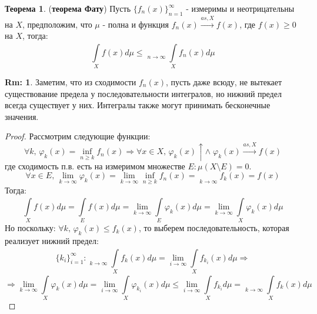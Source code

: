 \documentclass[12pt]{article}
\theoremstyle{definition}
\newtheorem{rem}{Rm:}
\newtheorem{theorem}{Теорема}
\newcommand{\ddint}[2]{\displaystyle\int\limits_{#1}^{#2}}
\DeclareMathOperator*\lowlim{\underline{lim}}
\begin{document}
\begin{theorem}(\textbf{теорема Фату})
	Пусть $\{f_n(x)\}_{n = 1}^{\infty}$ - измеримы и неотрицательны на $X$, предположим, что $\mu$ - полна и функция $f_n(x) \xrightarrow{as, X} f(x)$, где $f(x) \geq 0$ на $X$, тогда:
	$$
		\ddint{X}{}f(x)d\mu \leq \lowlim\limits_{n \to \infty}\ddint{X}{}f_n(x)d\mu
	$$
\end{theorem}
\begin{rem}
	Заметим, что из сходимости $f_n(x)$, пусть даже всюду, не вытекает существование предела у последовательности интегралов, но нижний предел всегда существует у них. Интегралы также могут принимать бесконечные значения.
\end{rem}

\begin{proof}
	Рассмотрим следующие функции: 
	$$
		\forall k, \, \varphi_k(x) = \inf\limits_{n \geq k}f_n(x) \Rightarrow \forall x \in X, \, \varphi_k(x) \uparrow \wedge \; \varphi_k(x) \xrightarrow{as, X} f(x)
	$$
	где сходимость п.в. есть на измеримом множестве $E \colon \mu(X \setminus E) = 0$. 
	$$
		\forall x \in E, \, \lim\limits_{k \to \infty}\varphi_k(x) = \lim\limits_{k \to \infty} \inf\limits_{n \geq k}f_n(x) = \lowlim\limits_{k \to \infty}f_k(x)  = f(x)
	$$
	Тогда:
	$$
		\ddint{X}{}f(x)d\mu = \ddint{E}{}f(x)d\mu = \lim\limits_{k \to \infty}\ddint{E}{}\varphi_k(x)d\mu = \lim\limits_{k \to \infty}\ddint{X}{}\varphi_k(x)d\mu
	$$
	Но поскольку: $\forall k, \, \varphi_k(x) \leq f_k(x)$, то выберем последовательность, которая реализует нижний предел: 
	$$
		\{k_i\}_{i = 1}^{\infty} \colon \lowlim\limits_{k \to \infty}\ddint{X}{}f_k(x)d\mu = \lim\limits_{i \to \infty}\ddint{X}{}f_{k_i}(x)d\mu \Rightarrow
	$$
	$$
		\Rightarrow \lim\limits_{k \to \infty}\ddint{X}{}\varphi_k(x)d\mu = \lim\limits_{i \to \infty}\ddint{X}{}\varphi_{k_i}(x)d\mu \leq \lim\limits_{i \to \infty}\ddint{X}{}f_{k_i}d\mu = \lowlim\limits_{k \to \infty}\ddint{X}{}f_k(x)d\mu
	$$
\end{proof}
\end{document}

